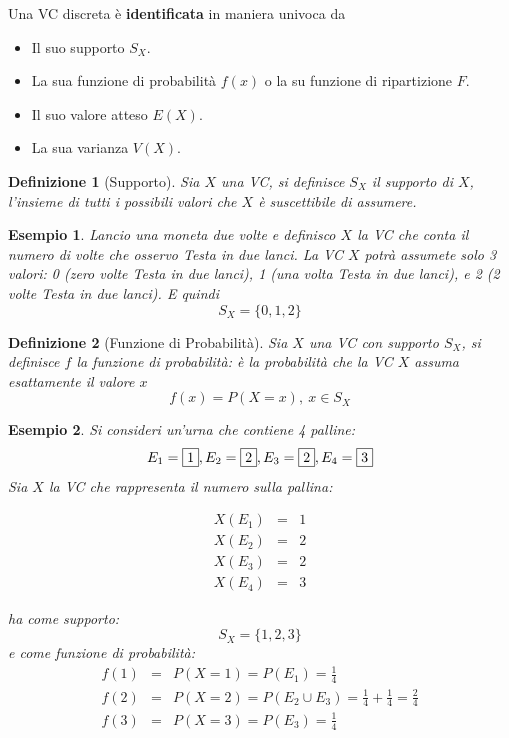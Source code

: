 \documentclass[
  11pt,
]{book}
\providecommand{\tightlist}{%
  \setlength{\itemsep}{0pt}\setlength{\parskip}{0pt}}
\theoremstyle{mytheoremstyle}
\theoremstyle{mydefstyle}
\newtheorem{definition}{Definizione}[section]
\newtheorem{example}{{Esempio}}[section]
\newenvironment{nota}
  {
\begin{tcolorbox}[enhanced,breakable,arc=0.1mm,boxrule=1pt,colback=white,colframe=iblue,title=\bf \fontfamily{lmss}\selectfont \faInfoCircle \hspace{.5 cm} Nota,drop fuzzy shadow]
}{
\end{tcolorbox}
  }
\begin{document}
\begin{nota}

Una VC discreta è \textbf{identificata} in maniera univoca da

\begin{itemize}
\tightlist
\item
  Il suo supporto \(S_X\).
\item
  La sua funzione di probabilità \(f(x)\) o la su funzione di ripartizione \(F\).
\item
  Il suo valore atteso \(E(X)\).
\item
  La sua varianza \(V(X).\)
\end{itemize}

\end{nota}

\begin{info}

\begin{definition}[Supporto]
Sia \(X\) una VC, si definisce \(S_X\) il supporto di \(X\), l'insieme di tutti i possibili valori che \(X\) è suscettibile di assumere.
\end{definition}

\end{info}

\begin{example}
Lancio una moneta due volte e definisco \(X\) la VC che \emph{conta il numero di volte che osservo Testa in due lanci}. La VC \(X\)
potrà assumete solo 3 valori: 0 (zero volte Testa in due lanci), 1 (una volta Testa in due lanci), e 2 (2 volte Testa in due lanci). E quindi
\[
S_X=\{0,1,2\}
\]
\end{example}

\begin{info}

\begin{definition}[Funzione di Probabilità]
Sia \(X\) una VC con supporto \(S_X\), si definisce \(f\) la funzione di probabilità:
è la probabilità che la VC \(X\) assuma esattamente il valore \(x\)
\[
f(x)=P(X=x), ~x\in S_X
\]
\end{definition}

\end{info}

\begin{example}
Si consideri un'urna che contiene 4 palline: \[E_1=\fbox{1},E_2=\fbox{2},E_3=\fbox{2},E_4=\fbox{3}\] Sia \(X\) la VC che rappresenta il numero sulla pallina:

\begin{eqnarray*}
X(E_1) &=& 1\\
X(E_2) &=& 2\\
X(E_3) &=& 2\\
X(E_4) &=& 3
\end{eqnarray*}

ha come supporto: \[S_X = \{1,2,3\}\] e come funzione di probabilità:
\begin{eqnarray*}
f(1)&=&P(X=1)=P(E_1)=\frac 1 4\\
f(2)&=&P(X=2)=P(E_2\cup E_3)=\frac 1 4+\frac 1 4=\frac 2 4\\
f(3)&=&P(X=3)=P(E_3)=\frac 1 4
\end{eqnarray*}
\end{example}
\end{document}
